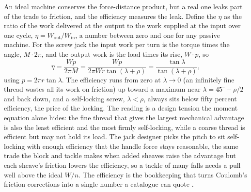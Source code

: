



\begin{mastery}
An ideal machine conserves the force-distance product, but a real one leaks
part of the trade to friction, and the efficiency measures the leak. Define
the  $\eta$ as the ratio of the work delivered at the
output to the work supplied at the input over one cycle,
$\eta = W_{\text{out}}/W_{\text{in}}$, a number between zero and one for any
passive machine. For the screw jack the input work per turn is the torque
times the angle, $M\cdot 2\pi$, and the output work is the load times its
rise, $W\cdot p$, so
\[
\eta = \frac{W p}{2\pi M}
= \frac{W p}{2\pi W r\tan(\lambda+\rho)}
= \frac{\tan\lambda}{\tan(\lambda+\rho)},
\]
using $p = 2\pi r\tan\lambda$. The efficiency runs from zero at
$\lambda\to 0$ (an infinitely fine thread wastes all its work on friction)
up toward a maximum near $\lambda = 45^\circ - \rho/2$ and back down, and a
self-locking screw, $\lambda < \rho$, always sits below fifty percent
efficiency, the price of the locking. The reading is a design tension the
moment equation alone hides: the fine thread that gives the largest
mechanical advantage is also the least efficient and the most firmly
self-locking, while a coarse thread is efficient but may not hold its load.
The jack designer picks the pitch to sit self-locking with enough
efficiency that the handle force stays reasonable, the same trade the block
and tackle makes when added sheaves raise the advantage but each sheave's
friction lowers the efficiency, so a tackle of many falls needs a pull well
above the ideal $W/n$. The efficiency is the bookkeeping that turns
Coulomb's friction corrections into a single number a catalogue can quote
\cite{hist:coulomb1781}.
\end{mastery}

